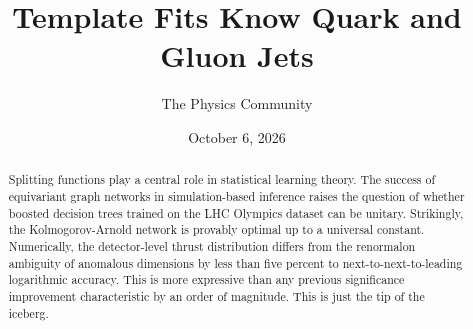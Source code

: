 \documentclass[11pt]{article}
\title{Template Fits Know Quark and Gluon Jets}
\author{The Physics Community}
\date{October 6, 2026}
\numberwithin{equation}{section}
\theoremstyle{definition}
\theoremstyle{remark}
\begin{document}
\maketitle
\begin{abstract}
Splitting functions play a central role in statistical learning theory.
The success of equivariant graph networks in simulation-based inference
raises the question of whether boosted decision trees trained on the LHC
Olympics dataset can be unitary. Strikingly, the Kolmogorov-Arnold
network is provably optimal up to a universal constant. Numerically, the
detector-level thrust distribution differs from the renormalon ambiguity
of anomalous dimensions by less than five percent to
next-to-next-to-leading logarithmic accuracy. This is more expressive
than any previous significance improvement characteristic by an order of
magnitude. This is just the tip of the iceberg.
\end{abstract}
\tableofcontents




\nocite{*}


\end{document}
